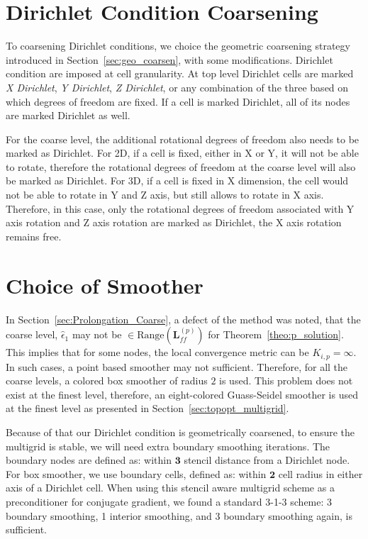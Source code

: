 \section{Dirichlet Condition Coarsening}
To coarsening Dirichlet conditions, we choice the geometric coarsening strategy introduced in Section~\ref{sec:geo_coarsen}, with some modifications. Dirichlet condition are imposed at cell granularity. At top level Dirichlet cells are marked \textit{X Dirichlet}, \textit{Y Dirichlet}, \textit{Z Dirichlet}, or any combination of the three based on which degrees of freedom are fixed. If a cell is marked Dirichlet, all of its nodes are marked Dirichlet as well. 

For the coarse level, the additional rotational degrees of freedom also needs to be marked as Dirichlet. For 2D, if a cell is fixed, either in X or Y, it will not be able to rotate, therefore the rotational degrees of freedom at the coarse level will also be marked as Dirichlet. For 3D, if a cell is fixed in X dimension, the cell would not be able to rotate in Y and Z axis, but still allows to rotate in X axis. Therefore, in this case, only the rotational degrees of freedom associated with Y axis rotation and Z axis rotation are marked as Dirichlet, the X axis rotation remains free.

\section{Choice of Smoother}
In Section~\ref{sec:Prolongation_Coarse}, a defect of the method was noted, that the coarse level,  $\hat{\epsilon}_1$ may not be $\in \text{Range}(\mathbf{L}^{(p)}_{ff})$ for Theorem~\ref{theo:p_solution}. This implies that for some nodes, the local convergence metric can be $K_{i,p} = \infty$. In such cases, a point based smoother may not sufficient. Therefore, for all the coarse levels, a colored box smoother of radius $2$ is used. This problem does not exist at the finest level, therefore, an eight-colored Guass-Seidel smoother is used at the finest level as presented in Section~\ref{sec:topopt_multigrid}. 

Because of that our Dirichlet condition is geometrically coarsened, to ensure the multigrid is stable, we will need extra boundary smoothing iterations. The boundary nodes are defined as: within $\mathbf{3}$ stencil distance from a Dirichlet node. For box smoother, we use boundary cells, defined as: within $\mathbf{2}$ cell radius in either axis of a Dirichlet cell. When using this stencil aware multigrid scheme as a preconditioner for conjugate gradient, we found a standard 3-1-3 scheme: 3 boundary smoothing, 1 interior smoothing, and 3 boundary smoothing again, is sufficient.

